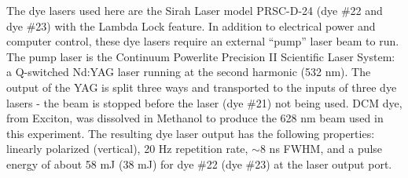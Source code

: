 The dye lasers used here are the Sirah Laser model PRSC-D-24 (dye \#22 and dye \#23) with the Lambda Lock feature. In addition to electrical power and computer control, these dye lasers require an external ``pump'' laser beam to run. The pump laser is the Continuum Powerlite Precision II Scientific Laser System: a Q-switched Nd:YAG laser running at the second harmonic (532 nm). The output of the YAG is split three ways and transported to the inputs of three dye lasers - the beam is stopped before the laser (dye \#21) not being used. DCM dye, from Exciton, was dissolved in Methanol to produce the 628 nm beam used in this experiment. The resulting dye laser output has the following properties: linearly polarized (vertical), 20 Hz repetition rate, $\sim$8 ns FWHM, and a pulse energy of about 58 mJ (38 mJ) for dye \#22 (dye \#23) at the laser output port.

